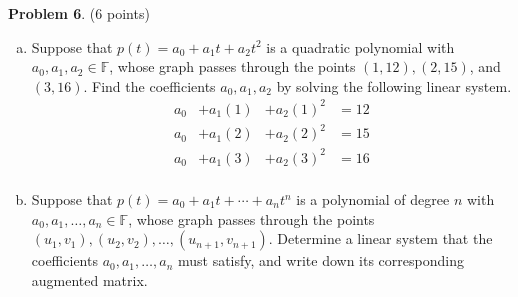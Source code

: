 \documentclass[reqno, 12pt]{amsart}
\theoremstyle{definition}
\newenvironment{problab}[1]
{\noindent\textbf{Problem #1}.}
{\vskip 6pt}
\theoremstyle{remark}
\newcommand{\F}{\mathbb F}
\begin{document}
\begin{problab}{6} (6 points)
  \begin{enumerate}[(a)]
    \item
      Suppose that $p(t) = a_0 + a_1 t + a_2 t^2$ is a quadratic polynomial with $a_0, a_1, a_2 \in \F$, whose graph passes through the points $(1,12), (2,15)$, and $(3,16)$. Find the coefficients $a_0, a_1, a_2$ by solving the following linear system.
      \begin{equation*}
        \begin{array}{cccc}
          a_0 & + a_1(1) & + a_2(1)^2 &= 12\\
          a_0 & + a_1(2) & + a_2(2)^2 &= 15\\
          a_0 & + a_1(3) & + a_2(3)^2 &= 16\\
        \end{array}
      \end{equation*}
    \item
      Suppose that $p(t) = a_0 + a_1 t + \cdots + a_n t^n$ is a polynomial of degree $n$ with $a_0, a_1, \ldots, a_n \in \F$, whose graph passes through the points $(u_1, v_1), (u_2, v_2), \ldots, (u_{n+1}, v_{n+1})$. Determine a linear system that the coefficients $a_0, a_1, \ldots, a_n$ must satisfy, and write down its corresponding augmented matrix.
  \end{enumerate}
\end{problab}
\end{document}
